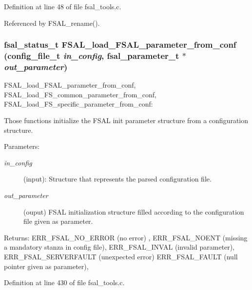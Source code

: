 Definition at line 48 of file fsal\_\-tools.c.

Referenced by FSAL\_\-rename().
\subsubsection[{FSAL\_\-load\_\-FSAL\_\-parameter\_\-from\_\-conf}]{\setlength{\rightskip}{0pt plus 5cm}fsal\_\-status\_\-t FSAL\_\-load\_\-FSAL\_\-parameter\_\-from\_\-conf (config\_\-file\_\-t {\em in\_\-config}, \/  fsal\_\-parameter\_\-t $\ast$ {\em out\_\-parameter})}\label{fsal__tools_8c_38fe03c0aa0fa100e90f3c0f8698c95e}


FSAL\_\-load\_\-FSAL\_\-parameter\_\-from\_\-conf, FSAL\_\-load\_\-FS\_\-common\_\-parameter\_\-from\_\-conf, FSAL\_\-load\_\-FS\_\-specific\_\-parameter\_\-from\_\-conf:

Those functions initialize the FSAL init parameter structure from a configuration structure.

\begin{Desc}
\item[Parameters:]
\begin{description}
\item[{\em in\_\-config}](input): Structure that represents the parsed configuration file. \item[{\em out\_\-parameter}](ouput) FSAL initialization structure filled according to the configuration file given as parameter.\end{description}
\end{Desc}
\begin{Desc}
\item[Returns:]ERR\_\-FSAL\_\-NO\_\-ERROR (no error) , ERR\_\-FSAL\_\-NOENT (missing a mandatory stanza in config file), ERR\_\-FSAL\_\-INVAL (invalid parameter), ERR\_\-FSAL\_\-SERVERFAULT (unexpected error) ERR\_\-FSAL\_\-FAULT (null pointer given as parameter), \end{Desc}


Definition at line 430 of file fsal\_\-tools.c.
